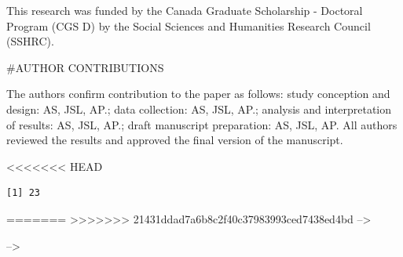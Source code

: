 \documentclass[]{trbunofficial}
\begin{document}
This research was funded by the Canada Graduate Scholarship - Doctoral
Program (CGS D) by the Social Sciences and Humanities Research Council
(SSHRC).

\#AUTHOR CONTRIBUTIONS

The authors confirm contribution to the paper as follows: study
conception and design: AS, JSL, AP.; data collection: AS, JSL, AP.;
analysis and interpretation of results: AS, JSL, AP.; draft manuscript
preparation: AS, JSL, AP. All authors reviewed the results and approved
the final version of the manuscript.

<<<<<<< HEAD
\begin{verbatim}
[1] 23
\end{verbatim}

=======
>>>>>>> 21431ddad7a6b8c2f40c37983993ced7438ed4bd
--\textgreater{}

--\textgreater{}

\newpage

\end{document}
